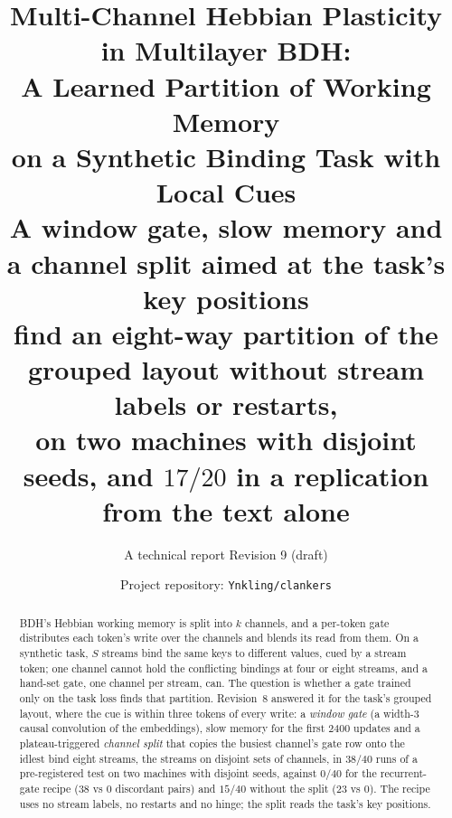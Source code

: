 \documentclass[11pt]{article}
\title{\vspace{-2.5em}\bfseries Multi-Channel Hebbian Plasticity in Multilayer BDH:\\
A Learned Partition of Working Memory\\ on a Synthetic Binding Task with Local Cues\\[0.3em]
\large\normalfont A window gate, slow memory and a channel split aimed at the task's key positions\\ find an eight-way partition of the grouped layout without stream labels or restarts,\\ on two machines with disjoint seeds, and $17/20$ in a replication from the text alone}
\author{A technical report \quad\textbullet\quad Revision 9 (draft)}
\date{Project repository: \texttt{Ynkling/clankers}}
\begin{document}
\maketitle
\vspace{-1.5em}

\begin{abstract}
BDH's Hebbian working memory is split into $k$ channels, and a per-token gate distributes each token's write over the channels and blends its read from them. On a synthetic task, $S$ streams bind the same keys to different values, cued by a stream token; one channel cannot hold the conflicting bindings at four or eight streams, and a hand-set gate, one channel per stream, can. The question is whether a gate trained only on the task loss finds that partition. Revision~8 answered it for the task's grouped layout, where the cue is within three tokens of every write: a \emph{window gate} (a width-3 causal convolution of the embeddings), slow memory for the first 2400 updates and a plateau-triggered \emph{channel split} that copies the busiest channel's gate row onto the idlest bind eight streams, the streams on disjoint sets of channels, in $38/40$ runs of a pre-registered test on two machines with disjoint seeds, against $0/40$ for the recurrent-gate recipe (38 vs 0 discordant pairs) and $15/40$ without the split (23 vs 0). The recipe uses no stream labels, no restarts and no hinge; the split reads the task's key positions.


\end{abstract}
\end{document}
